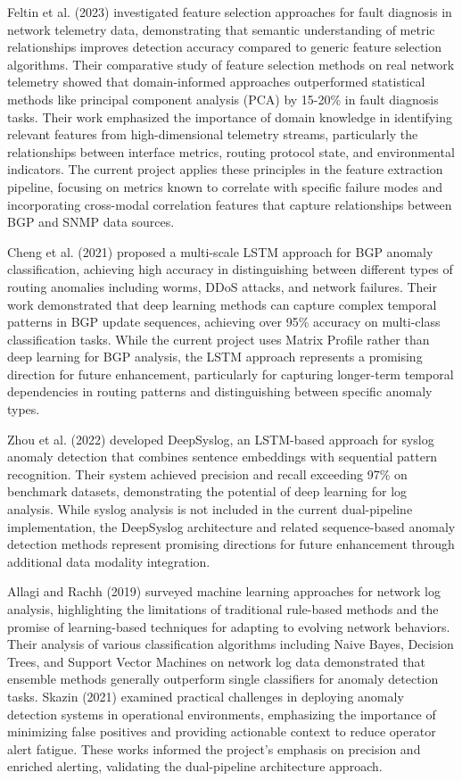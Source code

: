 \documentclass[11pt]{article}
\begin{document}
Feltin et al. (2023) investigated feature selection approaches for fault diagnosis in network telemetry data, demonstrating that semantic understanding of metric relationships improves detection accuracy compared to generic feature selection algorithms. Their comparative study of feature selection methods on real network telemetry showed that domain-informed approaches outperformed statistical methods like principal component analysis (PCA) by 15-20\% in fault diagnosis tasks. Their work emphasized the importance of domain knowledge in identifying relevant features from high-dimensional telemetry streams, particularly the relationships between interface metrics, routing protocol state, and environmental indicators. The current project applies these principles in the feature extraction pipeline, focusing on metrics known to correlate with specific failure modes and incorporating cross-modal correlation features that capture relationships between BGP and SNMP data sources.

Cheng et al. (2021) proposed a multi-scale LSTM approach for BGP anomaly classification, achieving high accuracy in distinguishing between different types of routing anomalies including worms, DDoS attacks, and network failures. Their work demonstrated that deep learning methods can capture complex temporal patterns in BGP update sequences, achieving over 95\% accuracy on multi-class classification tasks. While the current project uses Matrix Profile rather than deep learning for BGP analysis, the LSTM approach represents a promising direction for future enhancement, particularly for capturing longer-term temporal dependencies in routing patterns and distinguishing between specific anomaly types.

Zhou et al. (2022) developed DeepSyslog, an LSTM-based approach for syslog anomaly detection that combines sentence embeddings with sequential pattern recognition. Their system achieved precision and recall exceeding 97\% on benchmark datasets, demonstrating the potential of deep learning for log analysis. While syslog analysis is not included in the current dual-pipeline implementation, the DeepSyslog architecture and related sequence-based anomaly detection methods represent promising directions for future enhancement through additional data modality integration.

Allagi and Rachh (2019) surveyed machine learning approaches for network log analysis, highlighting the limitations of traditional rule-based methods and the promise of learning-based techniques for adapting to evolving network behaviors. Their analysis of various classification algorithms including Naive Bayes, Decision Trees, and Support Vector Machines on network log data demonstrated that ensemble methods generally outperform single classifiers for anomaly detection tasks. Skazin (2021) examined practical challenges in deploying anomaly detection systems in operational environments, emphasizing the importance of minimizing false positives and providing actionable context to reduce operator alert fatigue. These works informed the project's emphasis on precision and enriched alerting, validating the dual-pipeline architecture approach.
\end{document}
